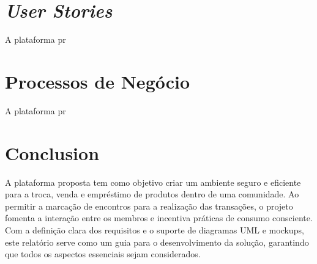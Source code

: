 \documentclass[a4paper, 12pt]{article} %
\begin{document}
\section*{\textit{User Stories}}

A plataforma pr

\newpage
\section*{Processos de Negócio}

A plataforma pr



\newpage
\section*{Conclusion}

A plataforma proposta tem como objetivo criar um ambiente seguro e eficiente para a troca, venda e empréstimo de produtos dentro de uma comunidade. Ao permitir a marcação de encontros para a realização das transações, o projeto fomenta a interação entre os membros e incentiva práticas de consumo consciente. 
Com a definição clara dos requisitos e o suporte de diagramas UML e mockups, este relatório serve como um guia para o desenvolvimento da solução, garantindo que todos os aspectos essenciais sejam considerados.







\end{document}
